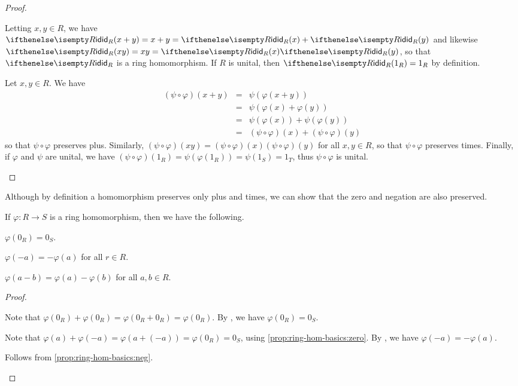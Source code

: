 \begin{proof}
\begin{inlineproplist}
\item Letting \(x,y \in R\), we have \(\ID[R](x+y) = x+y = \ID[R](x) + \ID[R](y)\) and likewise \(\ID[R](xy) = xy = \ID[R](x)\ID[R](y)\), so that \(\ID[R]\) is a ring homomorphism. If \(R\) is unital, then \(\ID[R](1_R) = 1_R\) by definition.
\item Let \(x,y \in R\). We have
\begin{eqnarray*}
(\psi \circ \varphi)(x+y)
 & = & \psi(\varphi(x+y)) \\
 & = & \psi(\varphi(x) + \varphi(y)) \\
 & = & \psi(\varphi(x)) + \psi(\varphi(y)) \\
 & = & (\psi \circ \varphi)(x) + (\psi \circ \varphi)(y)
\end{eqnarray*}
so that \(\psi \circ \varphi\) preserves plus. Similarly, \((\psi \circ \varphi)(xy) = (\psi \circ \varphi)(x)(\psi \circ \varphi)(y)\) for all \(x,y \in R\), so that \(\psi \circ \varphi\) preserves times. Finally, if \(\varphi\) and \(\psi\) are unital, we have \((\psi \circ \varphi)(1_R) = \psi(\varphi(1_R)) = \psi(1_S) = 1_T\), thus \(\psi \circ \varphi\) is unital.
\end{inlineproplist}
\end{proof}

Although by definition a homomorphism preserves only plus and times, we can show that the zero and negation are also preserved.

\begin{prop} \label{prop:ring-hom-basics}
If \(\varphi : R \rightarrow S\) is a ring homomorphism, then we have the following.
\begin{proplist}
\item \(\varphi(0_R) = 0_S\). \label{prop:ring-hom-basics:zero}
\item \(\varphi(-a) = -\varphi(a)\) for all \(r \in R\). \label{prop:ring-hom-basics:neg}
\item \(\varphi(a-b) = \varphi(a) - \varphi(b)\) for all \(a,b \in R\). \label{prop:ring-hom-basics:minus}
\end{proplist}
\end{prop}

\begin{proof}
\begin{inlineproplist}
\item Note that \(\varphi(0_R) + \varphi(0_R) = \varphi(0_R + 0_R) = \varphi(0_R)\). By , we have \(\varphi(0_R) = 0_S\).
\item Note that \(\varphi(a) + \varphi(-a) = \varphi(a + (-a)) = \varphi(0_R) = 0_S\), using \ref{prop:ring-hom-basics:zero}. By , we have \(\varphi(-a) = -\varphi(a)\).
\item Follows from \ref{prop:ring-hom-basics:neg}.
\end{inlineproplist}
\end{proof}


